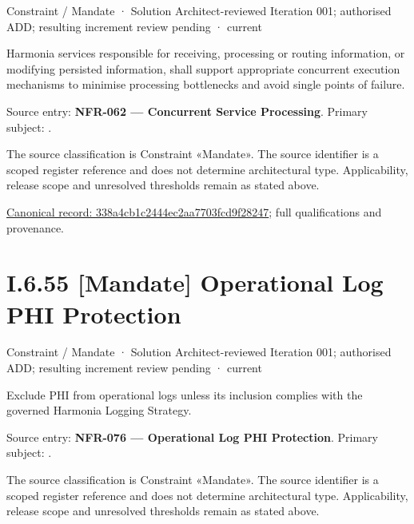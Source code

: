 \label{element:338a4cb1c2444ec2aa7703fcd9f28247}
{\small Constraint / Mandate · Solution Architect-reviewed Iteration 001; authorised ADD; resulting increment review pending · current}\par

Harmonia services responsible for receiving, processing or routing information, or modifying persisted information, shall support appropriate concurrent execution mechanisms to minimise processing bottlenecks and avoid single points of failure.



Source entry: \textbf{NFR-062 — Concurrent Service Processing}. Primary subject: \texttt{}.



The source classification is Constraint «Mandate». The source identifier is a scoped register reference and does not determine architectural type. Applicability, release scope and unresolved thresholds remain as stated above.


{\footnotesize \href{../../../../../../../../continuum/motivation/constraint/mandate/338a4cb1c2444ec2aa7703fcd9f28247.md}{Canonical record: 338a4cb1c2444ec2aa7703fcd9f28247}; full qualifications and provenance.}\par
\section*{I.6.55 [Mandate] Operational Log PHI Protection}
\label{navigation:I.6.55}

\label{element:ab99a48c29c14a1883e820baf98b643a}
{\small Constraint / Mandate · Solution Architect-reviewed Iteration 001; authorised ADD; resulting increment review pending · current}\par

Exclude PHI from operational logs unless its inclusion complies with the governed Harmonia Logging Strategy.



Source entry: \textbf{NFR-076 — Operational Log PHI Protection}. Primary subject: \texttt{}.



The source classification is Constraint «Mandate». The source identifier is a scoped register reference and does not determine architectural type. Applicability, release scope and unresolved thresholds remain as stated above.


